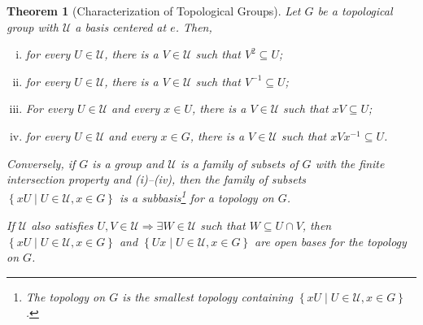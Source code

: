 \documentclass[12pt]{extarticle}
\newcommand{\set}[1]{\left\{#1\right\}}
\theoremstyle{plain}
\newtheorem*{theorem}{Theorem}
\theoremstyle{definition}
\theoremstyle{note}
\renewcommand{\newline}{\hfill\break}
\begin{document}
\begin{theorem}[Characterization of Topological Groups]
  Let $G$ be a topological group with $\mathcal{U}$ a basis centered at $e$. Then,
  \begin{enumerate}[(i)]
    \item for every $U\in \mathcal{U}$, there is a $V\in \mathcal{U}$ such that $V^{2} \subseteq U$;
    \item for every $U\in \mathcal{U}$, there is a $V\in \mathcal{U}$ such that $V^{-1}\subseteq U$;
    \item For every $U\in \mathcal{U}$ and every $x\in U$, there is a $V\in \mathcal{U}$ such that $xV \subseteq U$;
    \item for every $U\in \mathcal{U}$ and every $x\in G$, there is a $V\in \mathcal{U}$ such that $xVx^{-1}\subseteq U$.
  \end{enumerate}
  Conversely, if $G$ is a group and $\mathcal{U}$ is a family of subsets of $G$ with the finite intersection property and (i)--(iv), then the family of subsets $\set{xU\mid U\in \mathcal{U},x\in G}$ is a subbasis\footnote{The topology on $G$ is the smallest topology containing $\set{xU\mid U\in \mathcal{U},x\in G}$.} for a topology on $G$.\newline

  If $\mathcal{U}$ also satisfies $U,V\in \mathcal{U}\Rightarrow \exists W\in \mathcal{U}$ such that $W\subseteq U\cap V$, then $\set{xU\mid U\in \mathcal{U},x\in G}$ and $\set{Ux\mid U\in \mathcal{U},x\in G}$ are open bases for the topology on $G$.
\end{theorem}
\end{document}
